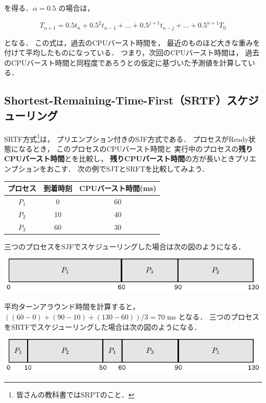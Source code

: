 を得る．$\alpha = 0.5$ の場合は，

\[T_{n+1} = 0.5 t_n + 0.5^2 t_{n-1} + \dots +
0.5^{j+1} t_{n-j} + \dots + 0.5^{n+1} T_0 \]

となる．
この式は，過去のCPUバースト時間を，
最近のものほど大きな重みを付けて平均したものになっている．
つまり，次回のCPUバースト時間は，
過去のCPUバースト時間と同程度であろうとの仮定に基づいた予測値を計算している．

\subsection{Shortest-Remaining-Time-First（SRTF）スケジューリング}
SRTF方式\footnote{皆さんの教科書ではSRPTのこと．}は，
プリエンプション付きのSJF方式である．
プロセスがReady状態になるとき，
このプロセスのCPUバースト時間と
実行中のプロセスの{\bf 残りCPUバースト時間}とを比較し，
{\bf 残りCPUバースト時間}の方が長いときプリエンプションをおこす．
次の例でSJTとSRFTを比較してみよう．

\begin{center}
\begin{tabular}{c c c}
プロセス & 到着時刻 & CPUバースト時間(ms) \\
\hline
$P_1$    & 0  & 60 \\
$P_2$    & 10 & 40 \\
$P_3$    & 60 & 30 \\
\end{tabular}
\end{center}

三つのプロセスをSJFでスケジューリングした場合は次の図のようになる．

\begin{center}
\includegraphics[scale=1.0]{Tbl/sjf2.pdf}
\end{center}

平均ターンアラウンド時間を計算すると，
$((60-0)+(90-10)+(130-60))/3=70$ ms となる．
三つのプロセスをSRTFでスケジューリングした場合は次の図のようになる．

\begin{center}
\includegraphics[scale=1.0]{Tbl/srtf1.pdf}
\end{center}

